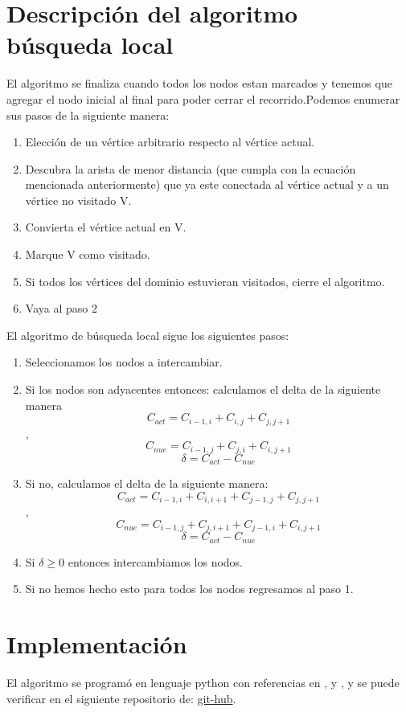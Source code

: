 \documentclass[12pt,a4paper]{article}
\begin{document}
\section{Descripción del algoritmo búsqueda local}
 El algoritmo se finaliza cuando todos los nodos estan marcados y tenemos que agregar el nodo inicial al final para poder cerrar el recorrido.Podemos enumerar sus pasos de la siguiente manera:
\begin{enumerate}
    \item Elección de un vértice arbitrario respecto al vértice actual.
    \item Descubra la arista de menor distancia (que cumpla con la ecuación mencionada anteriormente) que ya este conectada al vértice actual y a un vértice no visitado V.
    \item Convierta el vértice actual en V.
    \item Marque V como visitado.
    \item Si todos los vértices del dominio estuvieran visitados, cierre el algoritmo.
    \item Vaya al paso 2
\end{enumerate}
El algoritmo de búsqueda local sigue los siguientes pasos:
\begin{enumerate}
    \item Seleccionamos los nodos a intercambiar.
    \item Si los nodos son adyacentes entonces: calculamos el delta de la siguiente manera $$C_{act} = C_{i-1,i}+C_{i,j}+C_{j,j+1}$$, $$C_{nue} = C_{i-1,j}+C_{j,i}+C_{i,j+1}$$ $$\delta = C_{act} - C_{nue}$$
    \item Si no, calculamos el delta de la siguiente manera: $$C_{act} = C_{i-1,i}+C_{i,i+1}+C_{j-1,j}+C_{j,j+1}$$, $$C_{nue} = C_{i-1,j}+C_{j,i+1}+C_{j-1,i}+C_{i,j+1}$$ $$\delta = C_{act} - C_{nue}$$
    \item Si $\delta \geq 0$ entonces intercambiamos los nodos.
    \item Si no hemos hecho esto para todos los nodos regresamos al paso 1. 
\end{enumerate}
\section{Implementación} 
El algoritmo se programó en lenguaje python con referencias en \cite{van1991guia}, \cite{van2017tutorial} y \cite{chun2001core}, y se puede verificar en el siguiente repositorio de: \href{https://github.com/arnoldae9/PycharmProjects.git}{git-hub}.
\end{document}

